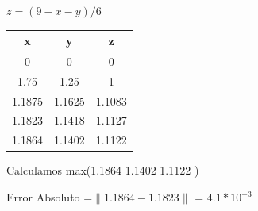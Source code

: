 \documentclass[12pt]{article}
\begin{document}
$z = (9-x-y)/6$

\begin{center}
\begin{tabular}{|c|c|c|}

\hline
x & y& z\\
\hline
0    & 0    & 0   \\
1.75  & 1.25    & 1   \\
1.1875   & 1.1625    & 1.1083    \\
1.1823   & 1.1418    & 1.1127    \\
1.1864   & 1.1402    & 1.1122  \\

\hline
\end{tabular}
\end{center}

Calculamos max(1.1864  1.1402   1.1122 )

Error Absoluto =$ \| 1.1864 - 1.1823\|$  = $4.1*10^{-3}$



\vspace{0.5cm}
\renewcommand{\refname}{\MakeUppercase{REFERENCIAS}}


\end{document}
